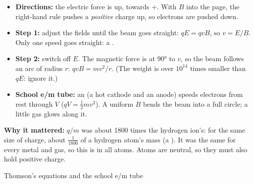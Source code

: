 \begin{itemize}
  \item \textbf{Directions:} the electric force is up, towards $+$. With $B$ into the page, the
        right-hand rule pushes a \emph{positive} charge up, so electrons are pushed down.
  \item \textbf{Step 1:} adjust the fields until the beam goes straight: $qE = qvB$, so $v = E/B$.
        Only one speed goes straight: a .
  \item \textbf{Step 2:} switch off $E$. The magnetic force is at \ang{90} to $v$, so the beam
        follows an arc of radius $r$: $qvB = mv^2/r$. (The weight is over $10^{14}$ times smaller
        than $qE$: ignore it.)
  \item \textbf{School e/m tube:} an  (a hot cathode and an anode) speeds
        electrons from rest through $V$
        ($qV = \tfrac12 mv^2$). A uniform $B$ bends the beam into a full circle; a little gas glows
        along it.
\end{itemize}

\textbf{Why it mattered:} $q/m$ was about 1800 times the hydrogen ion's: for the same size of
charge, about $\tfrac{1}{1800}$ of a hydrogen atom's mass (a ). It was the
same for every metal and gas, so this  is in all atoms. Atoms are neutral, so they
must also hold positive charge.

\begin{formulacard}[notonsheet]{Thomson's equations and the school e/m tube}
  \begin{symbols}
  \end{symbols}
\end{formulacard}

